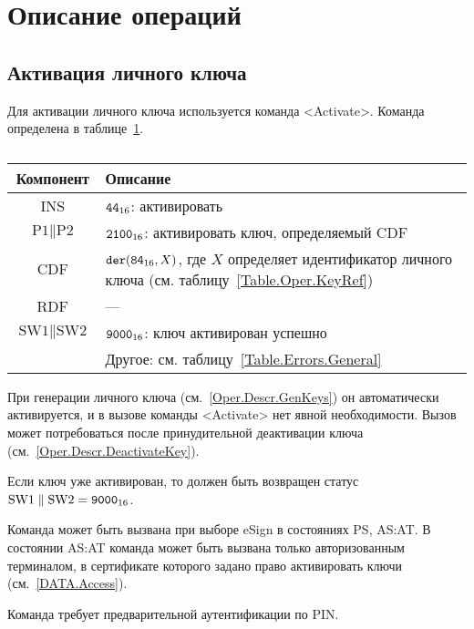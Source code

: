 \section{Описание операций}\label{Oper.Descr}

\subsection{Активация личного ключа}\label{Oper.Descr.ActivateKey}

Для активации личного ключа используется команда <Activate>.
Команда определена в таблице~\ref{Table.Oper.ActivateCmd}.

\begin{table}[hbt]
\caption{}\label{Table.Oper.ActivateCmd}
\begin{tabular}{|c|p{14cm}|}
\hline
Компонент & Описание\\
\hline
\hline
INS & $\texttt{44}_{16}$: активировать\\
\hline
$\text{P1} \parallel \text{P2}$ & $\texttt{2100}_{16}$: 
активировать ключ, определяемый CDF\\
\hline
CDF &  $\texttt{der}(\texttt{84}_{16}, X)$,   
где $X$ определяет идентификатор личного ключа 
(см. таблицу~\ref{Table.Oper.KeyRef}) \\ 
\hline
RDF &  --- \\
\hline
$\text{SW1} \parallel \text{SW2}$ & $\texttt{9000}_{16}$: ключ активирован успешно \\
\cline{2-2}
  & Другое: см. таблицу~\ref{Table.Errors.General} \\
\hline
\end{tabular}
\end{table}

При генерации личного ключа (см.~\ref{Oper.Descr.GenKeys})
он автоматически активируется, и в вызове команды <Activate> нет явной 
необходимости. Вызов может потребоваться после принудительной деактивации ключа 
(см.~\ref{Oper.Descr.DeactivateKey}).

Если ключ уже активирован, то должен быть 
возвращен статус $\text{SW1} \parallel \text{SW2} = \texttt{9000}_{16}$.

Команда может быть вызвана при выборе eSign в состояниях PS, AS:AT. В состоянии 
AS:AT команда может быть вызвана только авторизованным терминалом, в 
сертификате которого задано право активировать ключи (см.~\ref{DATA.Access}). 

Команда требует предварительной аутентификации по PIN.

